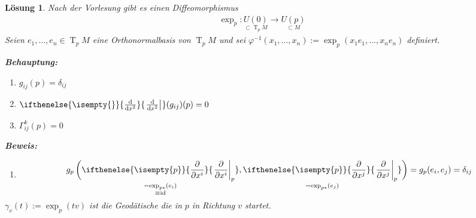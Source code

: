 \documentclass[paper=A4, twoside, chapterprefix=true, bibliography=totoc, headsepline]{scrbook}
\let\temp\phi{}
\let\phi\varphi{}
\let\varphi\temp{}
\let\temp\theta{}
\let\theta\vartheta{}
\let\vartheta\temp{}
\let\temp\epsilon{}
\let\epsilon\varepsilon{}
\let\varepsilon\temp{}
\let\temp\rho{}
\let\rho\varrho{}
\let\varrho\temp{}
\DeclareMathOperator{\id}{id}       %
\DeclareMathOperator{\T}{T}         %
\newcommand{\dop}{\mathrm{d}}
\newcommand{\difffrac}[3][]{\ifthenelse{\isempty{#1}}{\frac{\dop #2}{\dop #3}}{\left. \frac{\dop #2}{\dop #3} \right|_{#1}}}
\newcommand{\pdifffrac}[3][]{\ifthenelse{\isempty{#1}}{\frac{\partial #2}{\partial #3}}{\left. \frac{\partial #2}{\partial #3} \right|_{#1}}}
\theoremstyle{plain}
\theoremstyle{nonumberplain}
\theoremstyle{empty}
\theoremstyle{break}
\newtheorem{Loes}{L\"osung}
\begin{document}
\begin{Loes}
Nach der Vorlesung gibt es einen Diffeomorphismus
\begin{align*}
	\exp_p: \underset{\subset \T_pM}{U(0)} \to \underset{\subset M}{U(p)}
\end{align*}
Seien $e_1,\ldots , e_n \in \T_pM$ eine Orthonormalbasis von $\T_pM$ und sei $\phi^{-1}(x_1,\ldots ,x_n) := \exp_p(x_1e_1,\ldots ,x_ne_n)$ definiert.

\textbf{Behauptung:}\begin{enumerate}[label=(\roman*)]
\item
	$g_{ij}(p) = \delta_{ij}$
\item
	$\difffrac{}{x^2}(g_{ij})(p) = 0$
\item
	$\Gamma_{ij}^k(p) = 0$
\end{enumerate}
\textbf{Beweis:}\begin{enumerate}[label=(\roman*),leftmargin=*,widest=iii]
\item
	\begin{align*}
		g_p \left( \smash{ \underset{\substack{=\exp_{p*}(e_i) \\ \equiv \id}}{\pdifffrac[p]{}{x^{i}}}, \underset{= \exp_{p*}(e_j)}{\pdifffrac[p]{}{x^{j}}} } \vphantom{\pdifffrac{}{}} \right) = g_p(e_i, e_j) = \delta_{ij} \vphantom{\underset{\substack{a\\a}}{\pdifffrac{}{}}}
	\end{align*}
\end{enumerate}
$\gamma_v(t) := \exp_p(tv)$ ist die Geod\"atische die in $p$ in Richtung $v$ startet.


\end{Loes}
\end{document}
